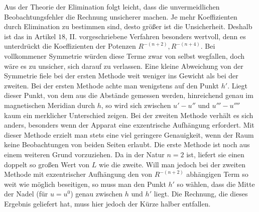 Aus der Theorie der Elimination folgt leicht, dass die unvermeidlichen Beobachtungsfehler die Rechnung unsicherer machen. Je mehr Koeffizienten durch Elimination zu bestimmen sind, desto größer ist die Unsicherheit. Deshalb ist das in Artikel $18$, II. vorgeschriebene Verfahren besonders wertvoll, denn es unterdrückt die Koeffizienten der Potenzen $R^{-(n+2)},R^{-(n+4)}$. Bei vollkommener Symmetrie würden diese Terme zwar von selbst wegfallen, doch wäre es zu unsicher, sich darauf zu verlassen. Eine kleine Abweichung von der Symmetrie fiele bei der ersten Methode weit weniger ins Gewicht als bei der zweiten. Bei der ersten Methode achte man wenigstens auf den Punkt $h'$. Liegt dieser Punkt, von dem aus die Abstände gemessen werden, hinreichend genau im magnetischen Meridian durch $h$, so wird sich zwischen $u'-u''$ und $u'''-u''''$ kaum ein merklicher Unterschied zeigen. Bei der zweiten Methode verhält es sich anders, besonders wenn der Apparat eine exzentrische Aufhängung erfordert. Mit dieser Methode erzielt man stets eine viel geringere Genauigkeit, wenn der Raum keine Beobachtungen von beiden Seiten erlaubt. Die erste Methode ist noch aus einem weiteren Grund vorzuziehen. Da in der Natur $n=2$ ist, liefert sie einen doppelt so großen Wert von $L$ wie die zweite. Will man jedoch bei der zweiten Methode mit exzentrischer Aufhängung den von $R^{-(n+2)}$ abhängigen Term so weit wie möglich beseitigen, so muss man den Punkt $h'$ so wählen, dass die Mitte der Nadel (für $u=u^0$) genau zwischen $h$ und $h'$ liegt. Die Rechnung, die dieses Ergebnis geliefert hat, muss hier jedoch der Kürze halber entfallen.

